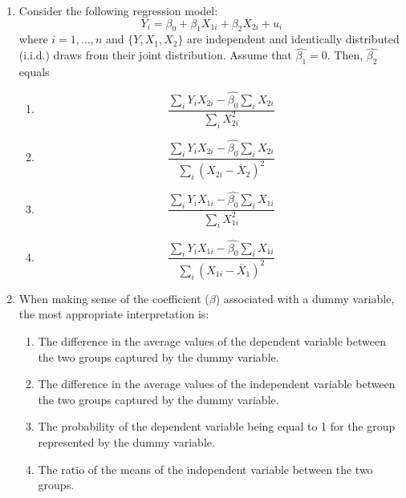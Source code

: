 \documentclass{article}
\begin{document}
\begin{enumerate}
\begin{enumerate}[label=\alph*)]
\item unbiased and consistent
\item unbiased and inconsistent
\item biased and consistent
\item biased and inconsistent
\end{enumerate}\vspace{.25cm}


\item Consider the following regression model:
\begin{equation*}
    Y_i = \beta_0 + \beta_1 X_{1i} + \beta_2 X_{2i} + u_i
\end{equation*}
where $i=1,...,n$ and $\{Y, X_1, X_2\}$ are independent and identically distributed (i.i.d.) draws from their joint
distribution. Assume that $\hat{\beta_1}=0$. Then,  $\hat{\beta_2}$ equals

\begin{enumerate}[label=\alph*)]
\item \begin{equation*}
    \frac{\sum_i Y_iX_{2i}-\hat{\beta_0}\sum_i X_{2i}}{\sum_i X_{2i}^2}
\end{equation*}

\item \begin{equation*}
    \frac{\sum_i Y_iX_{2i}-\hat{\beta_0}\sum_i X_{2i}}{\sum_i (X_{2i}-\overline{X}_2)^2}
\end{equation*}

\item \begin{equation*}
    \frac{\sum_i Y_iX_{1i}-\hat{\beta_0}\sum_i X_{1i}}{\sum_i X_{1i}^2}
\end{equation*}

\item \begin{equation*}
    \frac{\sum_i Y_iX_{1i}-\hat{\beta_0}\sum_i X_{1i}}{\sum_i (X_{1i}-\overline{X}_1)^2}
\end{equation*}

\end{enumerate}\vspace{.25cm}
\newpage
\item When making sense of the coefficient ($\beta$) associated with a dummy variable, the most appropriate interpretation is:
\begin{enumerate}[label=\alph*)]
    \item The difference in the average values of the dependent variable between the two groups captured by the dummy variable.
    \item The difference in the average values of the independent variable between the two groups captured by the dummy variable.
    \item The probability of the dependent variable being equal to 1 for the group represented by the dummy variable.
    \item The ratio of the means of the independent variable between the two groups.
\end{enumerate}\vspace{.25cm}


\end{enumerate}
\end{document}
